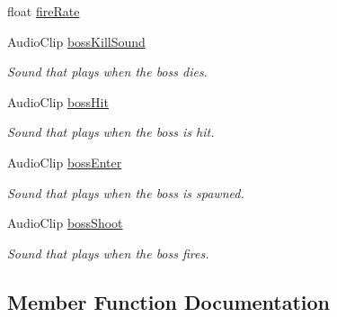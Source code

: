 \begin{DoxyCompactItemize}
float \mbox{\hyperlink{class_queen_bauss_a493ca87e362739138d3a758f267c2f9c}{fire\+Rate}}
\item 
\mbox{\label{class_queen_bauss_ab1eb1668c503a5ccef801c9d689f756f}} 
Audio\+Clip \mbox{\hyperlink{class_queen_bauss_ab1eb1668c503a5ccef801c9d689f756f}{boss\+Kill\+Sound}}
\begin{DoxyCompactList}\small\item\em Sound that plays when the boss dies. \end{DoxyCompactList}\item 
\mbox{\label{class_queen_bauss_a6166e72e2c9d4056bffe09629f55c61f}} 
Audio\+Clip \mbox{\hyperlink{class_queen_bauss_a6166e72e2c9d4056bffe09629f55c61f}{boss\+Hit}}
\begin{DoxyCompactList}\small\item\em Sound that plays when the boss is hit. \end{DoxyCompactList}\item 
\mbox{\label{class_queen_bauss_a63ad4d36e93462b57ae6de42ceb642ae}} 
Audio\+Clip \mbox{\hyperlink{class_queen_bauss_a63ad4d36e93462b57ae6de42ceb642ae}{boss\+Enter}}
\begin{DoxyCompactList}\small\item\em Sound that plays when the boss is spawned. \end{DoxyCompactList}\item 
\mbox{\label{class_queen_bauss_a9cff9aa86adc0ceccbd311bd007f5b5c}} 
Audio\+Clip \mbox{\hyperlink{class_queen_bauss_a9cff9aa86adc0ceccbd311bd007f5b5c}{boss\+Shoot}}
\begin{DoxyCompactList}\small\item\em Sound that plays when the boss fires. \end{DoxyCompactList}\end{DoxyCompactItemize}


\subsection{Member Function Documentation}
\mbox{\label{class_queen_bauss_a40fa065ef12d2fa9e9483c271d3e75a6}} 

